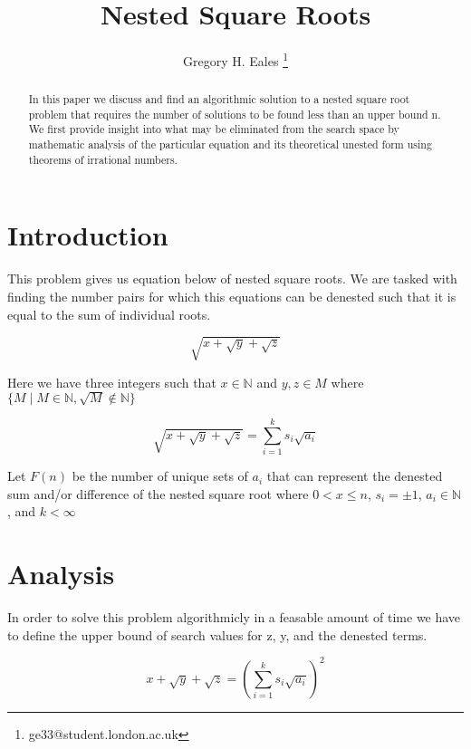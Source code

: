 \documentclass[12pt, letterpaper]{article}
\title{Nested Square Roots}
\author{Gregory H. Eales \thanks{ge33@student.london.ac.uk}}
\begin{document}
\maketitle

\begin{abstract}
In this paper we discuss and find an algorithmic solution to a nested square root problem that requires the number of solutions to be found less than an upper bound n. We first provide insight into what may be eliminated from the search space by mathematic analysis of the particular equation and its theoretical unested form using theorems of irrational numbers.
\end{abstract}

\section{Introduction}

This problem gives us equation below of nested square roots. We are tasked with finding the number pairs for which this equations can be denested such that it is equal to the sum of individual roots.

\begin{equation}
\sqrt{x + \sqrt{y} + \sqrt{z}}
\end{equation}

Here we have three integers such that $x \in  \mathbb{N}$ and $ y, z \in M$ where $  \{M \mid M \in \mathbb{N}, \sqrt{M} \notin\mathbb{N} \}$


\begin{equation}
\sqrt{x + \sqrt{y} + \sqrt{z}} = \sum_{i=1}^{k} s_{i} \sqrt{a_{i}}
\end{equation}

Let $F(n)$ be the number of unique sets of $a_{i}$ that can represent the denested sum and/or difference of the nested square root where $0 < x \leq n $, $s_{i} = \pm 1$, $a_{i} \in \mathbb{N}$, and $k < \infty$



\section{Analysis}

In order to solve this problem algorithmicly in a feasable amount of time we have to define the upper bound of search values for z, y, and the denested terms.

\begin{equation}
x + \sqrt{y} + \sqrt{z} = (\sum_{i=1}^{k} s_{i} \sqrt{a_{i}})^{2}
\end{equation}
\end{document}
